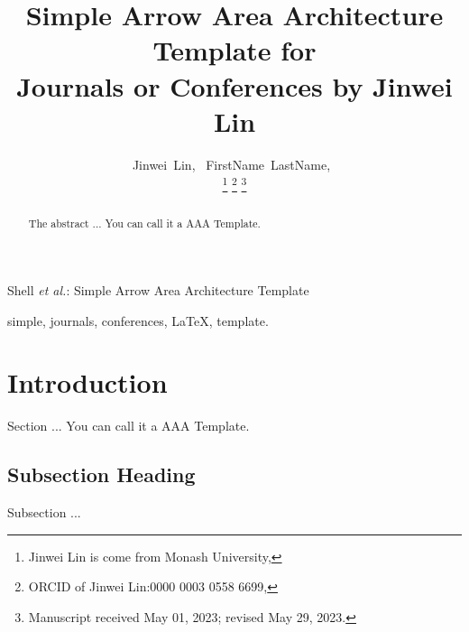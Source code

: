 \documentclass[journal]{IEEEtran}
\begin{document}
\title{Simple Arrow Area Architecture Template for\\Journals or Conferences by Jinwei Lin}


\author{Jinwei~Lin,~
        FirstName~LastName,~
        
\thanks{Jinwei Lin is come from Monash University,} 
\thanks{ORCID of Jinwei Lin:0000 0003 0558 6699,} 
\thanks{Manuscript received May 01, 2023; revised May 29, 2023.}} 

{Shell \MakeLowercase{\textit{et al.}}: Simple  Arrow Area Architecture Template}
\maketitle



\begin{abstract}
The abstract ...
You can call it a AAA Template.
\end{abstract}



\begin{IEEEkeywords}
simple, journals, conferences, \LaTeX, template.
\end{IEEEkeywords}




\section{Introduction}
Section ... \cite{ref2023}
You can call it a AAA Template.

\subsection{Subsection Heading}
Subsection ...
\end{document}
